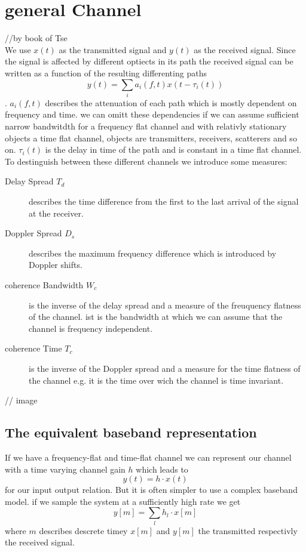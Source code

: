 \section{general Channel}
//by book of Tse\\
We use $x(t)$ as the transmitted signal and $y(t)$ as the received signal. Since the signal is affected by different optiects in its path the received signal can be written as a function of the resulting differenting paths $$y(t)=\sum_i{a_i(f,t)x(t-\tau_i(t))}$$. $a_i(f,t)$ describes the attenuation of each path which is mostly dependent on frequency and time. we can omitt these dependencies if we can assume sufficient narrow bandwitdth for a frequency flat channel and with relativly stationary objects a time flat channel, objects are transmitters, receivers, scatterers and so on. $\tau_i(t)$ is the delay in time of the path and is constant in a time flat channel.\\
To destinguish between these different channels we introduce some measures:
\begin{description}
	\item[Delay Spread $T_d$] describes the time difference from the first to the last arrival of the signal at the receiver.
	\item[Doppler Spread $D_s$] describes the maximum frequency difference which is introduced by Doppler shifts.
	\item[coherence Bandwidth $W_c$] is the inverse of the delay spread and a measure of the freuquency flatness of the channel. ist is the bandwidth at which we can assume that the channel is frequency independent.
	\item[coherence Time $T_c$] is the inverse of the Doppler spread and a measure for the time flatness of the channel e.g. it is the time over wich the channel is time invariant. 
\end{description}
// image

\subsection{The equivalent baseband representation}
If we have a frequency-flat and time-flat channel we can represent our channel with a time varying channel gain $h$ which leads to $$y(t) = h \cdot x(t)$$ for our input output relation. But it is often simpler to use a complex baseband model. if we sample the system at a sufficiently high rate we get $$y[m] = \sum_l{h_l \cdot x[m]}$$ where $m$ describes descrete timey $x[m]$ and $y[m]$ the transmitted respectivly the received signal.  

